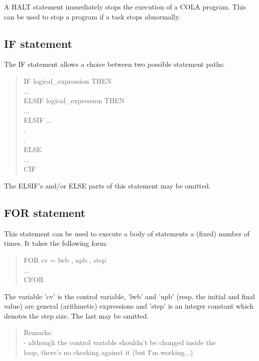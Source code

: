 A HALT statement immediately stops the execution of a COLA
program. This can be used to stop a program if a task stops abnormally.

\subsection*{IF statement}

The IF statement allows a choice between two possible statement
paths:
\begin{verse}
              IF logical\_expression THEN\\
                 ...\\
              ELSIF logical\_expression THEN\\
                 ...\\
	      ELSIF ...\\
                .\\
                .\\
              ELSE\\
                 ...\\
              CIF\\
\end{verse}

The ELSIF's and/or ELSE parts of this statement may be omitted.

\subsection*{FOR statement}


This statement can be used to execute a body of statements a
(fixed) number of times. It takes the following form:
\begin{verse}
              FOR cv = lwb , upb , step\\
                 ...\\
              CFOR\\
\end{verse}
The variable 'cv' is the control variable, 'lwb' and 'upb'
(resp. the initial and final value) are general (arithmetic)
expressions and 'step' is an integer constant which denotes
the step size. The last may be omitted.

\begin{verse}
              Remarks:\\

              - although the control variable shouldn't be changed inside the\\
                loop, there's no checking against it (but I'm working...)\\
\end{verse}

